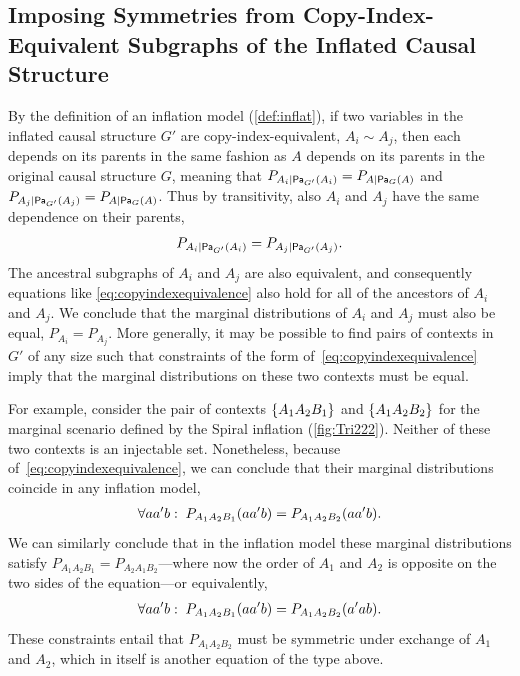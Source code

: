 \documentclass[aps,english,10pt,superscriptaddress,onecolumn,twoside,longbibliography,pra,floatfix,fleqn,nofootinbib]{revtex4-1}
\theoremstyle{definition}
\newcounter{example}[section]
\newcommand{\p}[2][]{{P_{#1}}\parenths{#2}}
\newcommand{\pfunc}[1]{P_{#1}}
\newcommand{\Pa}[2][]{{\mathsf{Pa}_{#1}}\parenths{#2}}
\DeclarePairedDelimiter{\parenths}{\lparen}{\rparen}
\DeclarePairedDelimiter{\braces}{\lbrace}{\rbrace}
\newcommand{\brackets}[1]{\braces*{#1}}
\begin{document}
\subsection{Imposing Symmetries from Copy-Index-Equivalent Subgraphs of the Inflated Causal Structure}\label{sec:copyindexequivalence}

By the definition of an inflation model (\cref{def:inflat}), if two variables in the inflated causal structure $G'$ are copy-index-equivalent, $A_i \sim A_j$, then each depends on its parents in the same fashion as $A$ depends on its parents in the original causal structure $G$, meaning that $\pfunc{A_i| \Pa[G']{A_i}}=\pfunc{A|\Pa[G]{A}}$ and $\pfunc{A_j| \Pa[G']{A_j}}=\pfunc{A|\Pa[G]{A}}$. Thus by transitivity, also $A_i$ and $A_j$ have the same dependence on their parents,
\begin{align}\label{eq:copyindexequivalence}
\pfunc{A_i| \Pa[G']{A_i}}=\pfunc{A_j|\Pa[G']{A_j}}.
 \end{align}
The ancestral subgraphs of $A_i$ and $A_j$ are also equivalent, and consequently equations like \cref{eq:copyindexequivalence} also hold for all of the ancestors of $A_i$ and $A_j$. We conclude that  the marginal distributions of $A_i$ and $A_j$ must also be equal, $\pfunc{A_i}=\pfunc{A_j}$.
More generally, it may be possible to find pairs of contexts in $G'$ of any size such that constraints of the form of~\cref{eq:copyindexequivalence} imply that the marginal distributions on these two contexts must be equal. 

For example, consider the pair of contexts $\brackets{A_1 A_2 B_1}$ and $\brackets{A_1 A_2 B_2}$ for the marginal scenario defined by the Spiral inflation (\cref{fig:Tri222}). Neither of these two contexts is an injectable set.  Nonetheless, because of~\cref{eq:copyindexequivalence}, we can conclude that their marginal distributions coincide in any inflation model,
\begin{align}\label{CIEconsequence}
\forall{a a' b}:\;\p[A_1 A_2 B_1]{a a' b} = \p[A_1 A_2 B_2]{a a' b}.
\end{align}
We can similarly conclude that in the inflation model these marginal distributions satisfy  $P_{A_1 A_2 B_1}=P_{A_2 A_1 B_2}$---where now the order of $A_1$ and $A_2$ is opposite on the two sides of the equation---or equivalently, 
\begin{align}\label{CIEconsequence2}
\forall{a a' b}:\;\p[A_1 A_2 B_1]{a a' b} = \p[A_1 A_2 B_2]{a' a b}.
\end{align}
These constraints entail that $P_{A_1 A_2 B_2}$ must be symmetric under exchange of $A_1$ and $A_2$, which in itself is another equation of the type above.
\end{document}
